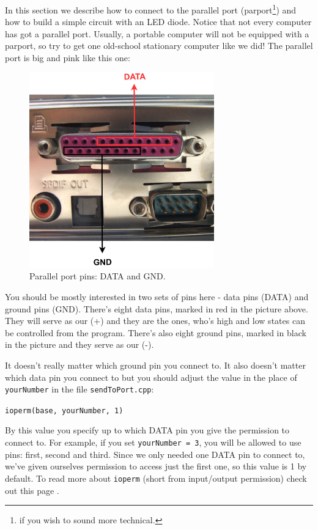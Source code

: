 \documentclass[12pt]{report}
\begin{document}
In this section we describe how to connect to the parallel port (parport\footnote{if you wish to sound more technical.}) and how to build a simple circuit with an LED diode. Notice that not every computer has got a parallel port. Usually, a portable computer will not be equipped with a parport, so try to get one old-school stationary computer like we did! The parallel port is big and pink like this one:

\begin{figure}[H]
\centering\includegraphics[width=8cm]{par_port}
\caption{Parallel port pins: DATA and GND.}				
\label{fig:par_port}
\end{figure}

You should be mostly interested in two sets of pins here - data pins (DATA) and ground pins (GND). There's eight data pins, marked in red in the picture above. They will serve as our (+) and they are the ones, who's high and low states can be controlled from the program. There's also eight ground pins, marked in black in the picture and they serve as our (-).

It doesn't really matter which ground pin you connect to. It also doesn't matter which data pin you connect to but you should adjust the value in the place of \verb|yourNumber| in the file \verb|sendToPort.cpp|:

\begin{snugshade}
\verb|ioperm(base, yourNumber, 1)|
\end{snugshade}

By this value you specify up to which DATA pin you give the permission to connect to. For example, if you set \verb|yourNumber = 3|, you will be allowed to use pins: first, second and third. Since we only needed one DATA pin to connect to, we've given ourselves permission to access just the first one, so this value is 1 by default. To read more about \verb|ioperm| (short from input/output permission) check out this page \cite{ioperm}.
\end{document}

